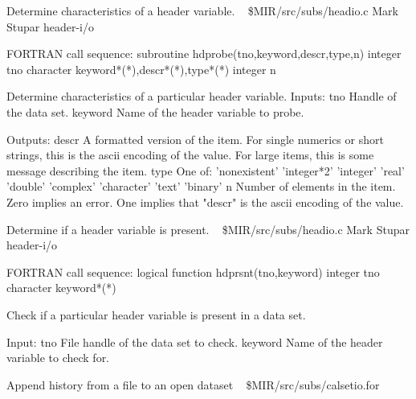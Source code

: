 %
\noindent Determine characteristics of a header variable.
\newline \ 
\newline {} \$MIR/src/subs/headio.c
\newline {} Mark Stupar
\newline {} header-i/o
\par{\tenpoint
{\eightpoint\begintt
FORTRAN call sequence:
        subroutine hdprobe(tno,keyword,descr,type,n)
        integer tno
        character keyword*(*),descr*(*),type*(*)
        integer n

  Determine characteristics of a particular header variable.
  Inputs:
    tno         Handle of the data set.
    keyword     Name of the header variable to probe.

  Outputs:
    descr       A formatted version of the item. For single numerics or
                short strings, this is the ascii encoding of the value. For
                large items, this is some message describing the item.
    type        One of:
                  'nonexistent'
                  'integer*2'
                  'integer'
                  'real'
                  'double'
                  'complex'
                  'character'
                  'text'
                  'binary'
    n           Number of elements in the item. Zero implies an error. One
                implies that "descr" is the ascii encoding of the value. 
\endtt}
\par}
%
\noindent Determine if a header variable is present.
\newline \ 
\newline {} \$MIR/src/subs/headio.c
\newline {} Mark Stupar
\newline \abox{Keywords:} header-i/o
\par{\tenpoint
{\eightpoint\begintt
FORTRAN call sequence:
        logical function hdprsnt(tno,keyword)
        integer tno
        character keyword*(*)

  Check if a particular header variable is present in a data set.

  Input:
    tno         File handle of the data set to check.
    keyword     Name of the header variable to check for.               
\endtt}
\par}
%
\noindent Append history from a file to an open dataset
\newline \ 
\newline {} \$MIR/src/subs/calsetio.for
